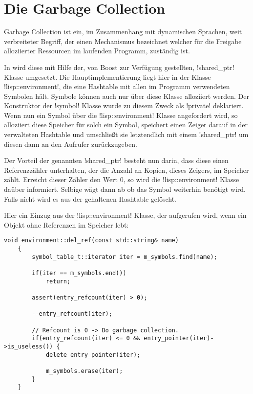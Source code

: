 \section{Die Garbage Collection}
\label{sec:shared_ptr}

Garbage Collection ist ein, im Zusammenhang mit dynamischen Sprachen,
weit verbreiteter Begriff, der
einen Mechanismus bezeichnet welcher für die Freigabe alloziierter
Ressourcen im laufenden Programm, zuständig
ist.

In \projectname{} wird diese mit Hilfe der, von Boost zur Verfügung
gestellten, !shared_ptr! Klasse umgesetzt.
Die Hauptimplementierung liegt hier in der Klasse !lisp::environment!,
die eine Hashtable mit allen
im Programm verwendeten Symbolen hält.
Symbole können auch nur über diese Klasse alloziiert werden.
Der Konstruktor der !symbol! Klasse wurde zu diesem Zweck als !private! deklariert.
Wenn nun ein Symbol über die !lisp::environment! Klasse angefordert wird,
so alloziiert diese Speicher für solch ein Symbol,
speichert einen Zeiger darauf in der verwalteten Hashtable
und umschließt sie letztendlich mit einem !shared_ptr!
um diesen dann an den Aufrufer zurückzugeben.

Der Vorteil der genannten !shared_ptr! besteht nun darin,
dass diese einen Referenzzähler unterhalten,
der die Anzahl an Kopien, dieses Zeigers, im Speicher zählt.
Erreicht dieser Zähler den Wert 0, so
wird die !lisp::environment! Klasse daüber informiert.
Selbige wägt dann ab ob das Symbol weiterhin benötigt
wird. Falls nicht wird es aus der gehaltenen Hashtable gelöscht.

Hier ein Einzug aus der !lisp::environment! Klasse, der aufgerufen wird, wenn
ein Objekt ohne Referenzen im Speicher lebt:

\begin{lstlisting}[caption={Symbolbeseitigung}, label=lst:del_ref]
    void environment::del_ref(const std::string& name) 
    {
        symbol_table_t::iterator iter = m_symbols.find(name);

        if(iter == m_symbols.end())
            return;

        assert(entry_refcount(iter) > 0);

        --entry_refcount(iter);

        // Refcount is 0 -> Do garbage collection.
        if(entry_refcount(iter) <= 0 && entry_pointer(iter)->is_useless()) {
            delete entry_pointer(iter);

            m_symbols.erase(iter);
        }
    }
\end{lstlisting}


